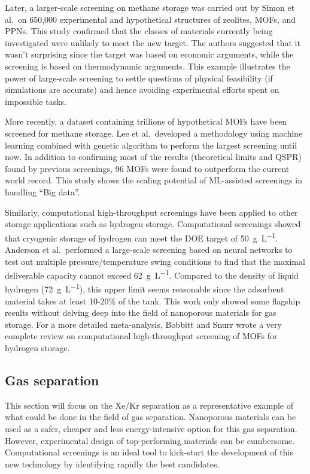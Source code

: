 \documentclass[main.tex]{subfiles}
\begin{document}
Later, a larger-scale screening on methane storage was carried out by Simon et al.\ on 650,000 experimental and hypothetical structures of zeolites, MOFs, and PPNs. This study confirmed that the classes of materials currently being investigated were unlikely to meet the new target. The authors suggested that it wasn't surprising since the target was based on economic arguments, while the screening is based on thermodynamic arguments.\autocite{Simon_2015_EES} This example illustrates the power of large-scale screening to settle questions of physical feasibility (if simulations are accurate) and hence avoiding experimental efforts spent on impossible tasks.

More recently, a dataset containing trillions of hypothetical MOFs have been screened for methane storage.\autocite{Lee_2021} Lee et al.\ developed a methodology using machine learning combined with genetic algorithm to perform the largest screening until now. In addition to confirming most of the results (theoretical limits and QSPR) found by previous screenings, 96 MOFs were found to outperform the current world record. This study shows the scaling potential of ML-assisted screenings in handling ``Big data''.

Similarly, computational high-throughput screenings have been applied to other storage applications such as hydrogen storage. Computational screenings showed that cryogenic storage of hydrogen can meet the DOE target of \SI{50}{\gram\per\liter}.\autocite{Gomez_Gualdron_2016, Bobbitt_2016, Thornton_2017} Anderson et al.\ performed a large-scale screening based on neural networks to test out multiple pressure/temperature swing conditions to find that the maximal deliverable capacity cannot exceed \SI{62}{\gram\per\liter}.\autocite{Anderson_2018} Compared to the density of liquid hydrogen (\SI{72}{\gram\per\liter}), this upper limit seems reasonable since the adsorbent material takes at least {10-20\%} of the tank. This work only showed some flagship results without delving deep into the field of nanoporous materials for gas storage. For a more detailed meta-analysis, Bobbitt and Snurr wrote a very complete review on computational high-throughput screening of MOFs for hydrogen storage.\autocite{Bobbitt_2019}

\subsection{Gas separation}

This section will focus on the Xe/Kr separation as a representative example of what could be done in the field of gas separation. Nanoporous materials can be used as a safer, cheaper and less energy-intensive option for this gas separation. However, experimental design of top-performing materials can be cumbersome. Computational screenings is an ideal tool to kick-start the development of this new technology by identifying rapidly the best candidates.
\end{document}
